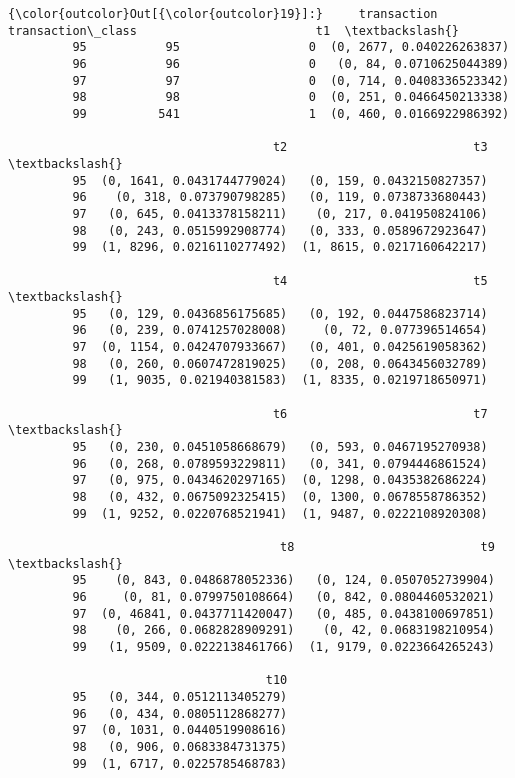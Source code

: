 \documentclass[11pt]{article}
\begin{document}
\begin{Verbatim}[commandchars=\\\{\}]
{\color{outcolor}Out[{\color{outcolor}19}]:}     transaction  transaction\_class                         t1  \textbackslash{}
         95           95                  0  (0, 2677, 0.040226263837)   
         96           96                  0   (0, 84, 0.0710625044389)   
         97           97                  0  (0, 714, 0.0408336523342)   
         98           98                  0  (0, 251, 0.0466450213338)   
         99          541                  1  (0, 460, 0.0166922986392)   
         
                                     t2                          t3  \textbackslash{}
         95  (0, 1641, 0.0431744779024)   (0, 159, 0.0432150827357)   
         96    (0, 318, 0.073790798285)   (0, 119, 0.0738733680443)   
         97   (0, 645, 0.0413378158211)    (0, 217, 0.041950824106)   
         98   (0, 243, 0.0515992908774)   (0, 333, 0.0589672923647)   
         99  (1, 8296, 0.0216110277492)  (1, 8615, 0.0217160642217)   
         
                                     t4                          t5  \textbackslash{}
         95   (0, 129, 0.0436856175685)   (0, 192, 0.0447586823714)   
         96   (0, 239, 0.0741257028008)     (0, 72, 0.077396514654)   
         97  (0, 1154, 0.0424707933667)   (0, 401, 0.0425619058362)   
         98   (0, 260, 0.0607472819025)   (0, 208, 0.0643456032789)   
         99   (1, 9035, 0.021940381583)  (1, 8335, 0.0219718650971)   
         
                                     t6                          t7  \textbackslash{}
         95   (0, 230, 0.0451058668679)   (0, 593, 0.0467195270938)   
         96   (0, 268, 0.0789593229811)   (0, 341, 0.0794446861524)   
         97   (0, 975, 0.0434620297165)  (0, 1298, 0.0435382686224)   
         98   (0, 432, 0.0675092325415)  (0, 1300, 0.0678558786352)   
         99  (1, 9252, 0.0220768521941)  (1, 9487, 0.0222108920308)   
         
                                      t8                          t9  \textbackslash{}
         95    (0, 843, 0.0486878052336)   (0, 124, 0.0507052739904)   
         96     (0, 81, 0.0799750108664)   (0, 842, 0.0804460532021)   
         97  (0, 46841, 0.0437711420047)   (0, 485, 0.0438100697851)   
         98    (0, 266, 0.0682828909291)    (0, 42, 0.0683198210954)   
         99   (1, 9509, 0.0222138461766)  (1, 9179, 0.0223664265243)   
         
                                    t10  
         95   (0, 344, 0.0512113405279)  
         96   (0, 434, 0.0805112868277)  
         97  (0, 1031, 0.0440519908616)  
         98   (0, 906, 0.0683384731375)  
         99  (1, 6717, 0.0225785468783)  
\end{Verbatim}
            

    
    
    
    
\end{document}
